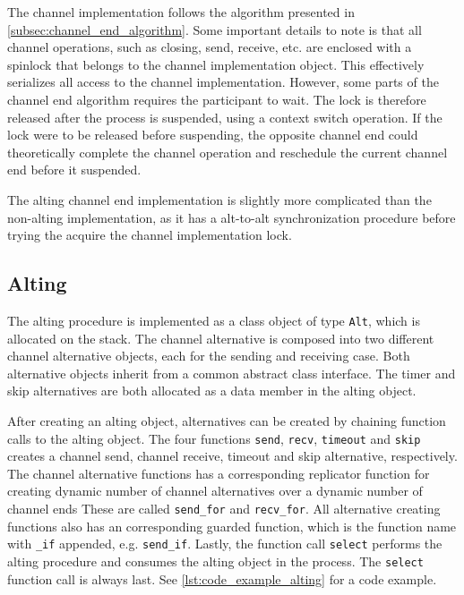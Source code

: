 The channel implementation follows the algorithm presented in \cref{subsec:channel_end_algorithm}. Some important details to note is that all channel operations, such as closing, send, receive, etc. are enclosed with a spinlock that belongs to the channel implementation object. This effectively serializes all access to the channel implementation. However, some parts of the channel end algorithm requires the participant to wait. The lock is therefore released after the process is suspended, using a context switch operation. If the lock were to be released before suspending, the opposite channel end could theoretically complete the channel operation and reschedule the current channel end before it suspended.

The alting channel end implementation is slightly more complicated than the non\hyp{}alting implementation, as it has a alt\hyp{}to\hyp{}alt synchronization procedure before trying the acquire the channel implementation lock.


\subsection{Alting}


The alting procedure is implemented as a class object of type \lstinline[style={CustomC++}]|Alt|, which is allocated on the stack. The channel alternative is composed into two different channel alternative objects, each for the sending and receiving case. Both alternative objects inherit from a common abstract class interface. The timer and skip alternatives are both allocated as a data member in the alting object. 

After creating an alting object, alternatives can be created by chaining function calls to the alting object. The four functions \texttt{send}, \texttt{recv}, \texttt{timeout} and \texttt{skip} creates a channel send, channel receive, timeout and skip alternative, respectively. The channel alternative functions has a corresponding replicator function for creating dynamic number of channel alternatives over a dynamic number of channel ends These are called \texttt{send\_for} and \texttt{recv\_for}. All alternative creating functions also has an corresponding guarded function, which is the function name with \texttt{\_if} appended, e.g. \texttt{send\_if}. Lastly, the function call \texttt{select} performs the alting procedure and consumes the alting object in the process. The \texttt{select} function call is always last. See \cref{lst:code_example_alting} for a code example.

